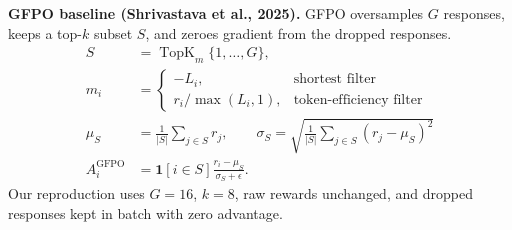 \documentclass[border=8pt]{standalone}
\begin{document}
\begin{minipage}{6.7in}
\color{textdark}
\large
\textbf{\color{uwpurple} GFPO baseline (Shrivastava et al., 2025).}
GFPO oversamples $G$ responses, keeps a top-$k$ subset $S$, and zeroes
gradient from the dropped responses.
\[
\begin{aligned}
S &= \operatorname{TopK}_{m}\{1,\ldots,G\},\\
m_i &=
\begin{cases}
-L_i, & \text{shortest filter}\\
r_i/\max(L_i,1), & \text{token-efficiency filter}
\end{cases}\\[1mm]
\mu_S &= \frac{1}{|S|}\sum_{j\in S} r_j,\qquad
\sigma_S=\sqrt{\frac{1}{|S|}\sum_{j\in S}(r_j-\mu_S)^2}\\[1mm]
A_i^{\mathrm{GFPO}} &=
\mathbf{1}[i\in S]\frac{r_i-\mu_S}{\sigma_S+\epsilon}.
\end{aligned}
\]
Our reproduction uses $G=16$, $k=8$, raw rewards unchanged, and dropped
responses kept in batch with zero advantage.
\end{minipage}
\end{document}
